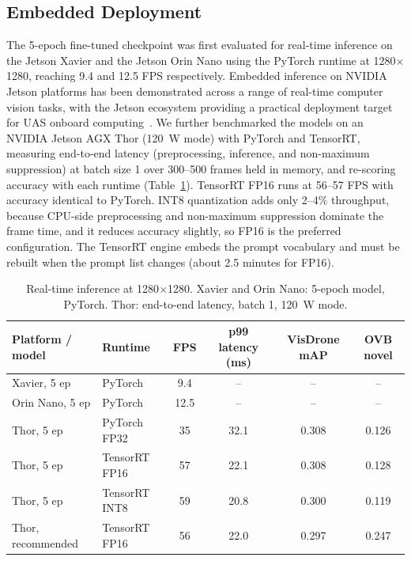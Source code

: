 \documentclass[conf]{new-aiaa}
\begin{document}
\subsection{Embedded Deployment}

The 5-epoch fine-tuned checkpoint was first evaluated for real-time inference on the Jetson
Xavier and the Jetson Orin Nano using the PyTorch runtime at 1280$\times$1280, reaching 9.4 and
12.5 FPS respectively. Embedded inference on {NVIDIA} Jetson platforms has been demonstrated
across a range of real-time computer vision tasks, with the Jetson ecosystem providing a
practical deployment target for {UAS} onboard computing~\cite{mittal2019survey}. We further
benchmarked the models on an NVIDIA Jetson AGX Thor (120~W mode) with PyTorch and TensorRT,
measuring end-to-end latency (preprocessing, inference, and non-maximum suppression) at batch
size 1 over 300--500 frames held in memory, and re-scoring accuracy with each runtime
(Table~\ref{tab:thor}). TensorRT FP16 runs at 56--57 FPS with accuracy identical to PyTorch.
INT8 quantization adds only 2--4\% throughput, because CPU-side preprocessing and
non-maximum suppression dominate the frame time, and it reduces accuracy slightly, so FP16 is
the preferred configuration. The TensorRT engine embeds the prompt vocabulary and must be
rebuilt when the prompt list changes (about 2.5 minutes for FP16).

\begin{table}[hbt!]
\caption{Real-time inference at 1280$\times$1280. Xavier and Orin Nano: 5-epoch model,
         PyTorch. Thor: end-to-end latency, batch 1, 120~W mode.}
\label{tab:thor}
\centering
\begin{tabular}{llcccc}
\hline
\textbf{Platform / model} & \textbf{Runtime} & \textbf{FPS} & \textbf{p99 latency (ms)} & \textbf{VisDrone mAP} & \textbf{OVB novel} \\
\hline
Xavier, 5 ep        & PyTorch        & 9.4  & -- & -- & -- \\
Orin Nano, 5 ep     & PyTorch        & 12.5 & -- & -- & -- \\
Thor, 5 ep          & PyTorch FP32   & 35 & 32.1 & 0.308 & 0.126 \\
Thor, 5 ep          & TensorRT FP16  & 57 & 22.1 & 0.308 & 0.128 \\
Thor, 5 ep          & TensorRT INT8  & 59 & 20.8 & 0.300 & 0.119 \\
Thor, recommended   & TensorRT FP16  & 56 & 22.0 & 0.297 & 0.247 \\
\hline
\end{tabular}
\end{table}
\end{document}
